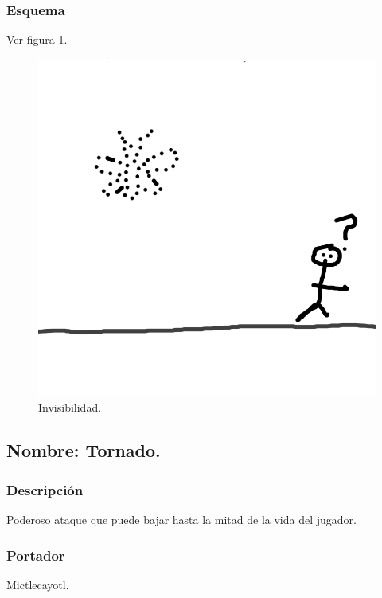\documentclass[11pt,letterpaper]{article}
\begin{document}
\subsubsection{Esquema}
			Ver figura \ref{fig:invisibilidad}.
			\begin{figure}
				\centering
				\includegraphics[height=0.2 \textheight]{Imagenes/invisibilidad}
				\caption{Invisibilidad.}
				\label{fig:invisibilidad}
			\end{figure}
\subsection{Nombre: Tornado.}
\subsubsection{Descripción}
Poderoso ataque que puede bajar hasta la mitad de la vida del jugador.
\subsubsection{Portador}
Mictlecayotl.
\end{document}
